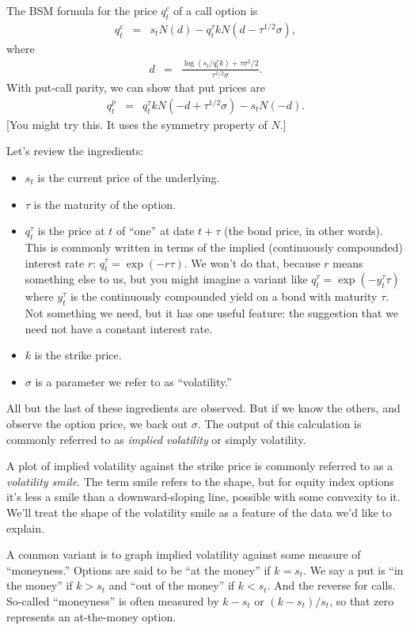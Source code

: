 \documentclass[11pt]{article}
\begin{document}
The BSM formula for the price $q^c_t$ of a call option is
\begin{eqnarray}
        q^c_t &=& s_t N(d) - q^\tau_t k N (d - \tau^{1/2}\sigma ),
        \label{eq:bsm-call}
\end{eqnarray}
where
\begin{eqnarray*}
          d &=& \frac{\log(s_t/q^\tau_t k) + \tau \sigma^2/2}{\tau^{1/2}\sigma} .
\end{eqnarray*}
With put-call parity, we can show that put prices are
\begin{eqnarray}
        q^p_t &=& q^\tau_t k N(-d + \tau^{1/2} \sigma) - s_t N(-d) .
        \label{eq:bsm-put}
\end{eqnarray}
[You might try this. It uses the symmetry property of $N$.]

Let's review the ingredients:
\begin{itemize}
\item $s_t$ is the current price of the underlying.
\item $\tau$ is the maturity of the option.
\item $q_t^\tau$ is the price at $t$ of ``one'' at date $t+\tau$  (the bond price, in other words).
This is commonly written in terms of the implied (continuously compounded) interest rate $r$:
$q_t^\tau = \exp(-r \tau)$.
We won't do that, because $r$ means something else to us, but you might imagine
a variant like $q_t^\tau = \exp(-y_t^\tau \tau)$
where $y_t^\tau$ is the continuously compounded yield on a bond with maturity $\tau$.
Not something we need, but it has one useful feature:
the suggestion that we need not have a constant interest rate.
\item $k$ is the strike price.
\item $\sigma$ is a parameter we refer to as ``volatility.''
\end{itemize}
All but the last of these ingredients are observed.
But if we know the others,
and observe the option price, we back out $\sigma$.
The output of this calculation is commonly referred to as {\it implied volatility\/}
or simply volatility.


A plot of implied volatility against the strike price
is commonly referred to as a {\it volatility smile\/}.
The term smile refers to the shape, but for equity index options
it's less a smile than a downward-sloping line, possible with some
convexity to it.
We'll treat the shape of the volatility smile as a feature of the data we'd like
to explain.

A common variant is to graph implied volatility against
some measure of ``moneyness.''
Options are said to be ``at the money'' if $ k = s_t$.
We say a put is ``in the money'' if $k > s_t $ and ``out of the money''
if $ k< s_t $.
And the reverse for calls.
So-called ``moneyness'' is often measured by $ k-s_t$ or $(k-s_t)/s_t$,
so that zero represents an at-the-money option.
\end{document}
